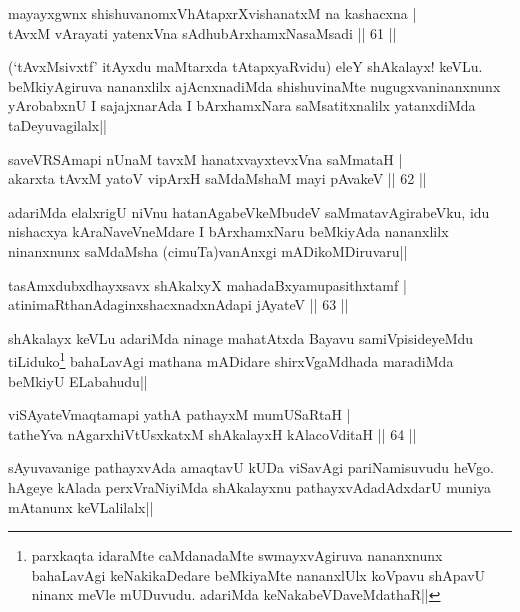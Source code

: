 \begin{shl}
mayayxgwnx shishuvanomxVhAtapxrXvishanatxM na kashacxna |\\
tAvxM vArayati yatenxVna sAdhubArxhamxNasaMsadi \hfill || 61 ||
\end{shl}

\begin{artha}
(`tAvxMsivxtf' itAyxdu maMtarxda tAtapxyaRvidu) eleY shAkalayx! keVLu. beMkiyAgiruva nananxlilx ajAcnxnadiMda shishuvinaMte nugugxvaninanxnunx yArobabxnU I sajajxnarAda I bArxhamxNara saMsatitxnalilx yatanxdiMda taDeyuvagilalx||
\end{artha}

\begin{shl}
saveVRSAmapi nUnaM tavxM hanatxvayxtevxVna saMmataH |\\
akarxta tAvxM yatoV vipArxH saMdaMshaM mayi pAvakeV \hfill || 62 ||
\end{shl}

\begin{artha}
adariMda elalxrigU niVnu hatanAgabeVkeMbudeV saMmatavAgirabeVku, idu nishacxya kAraNaveVneMdare I bArxhamxNaru beMkiyAda nananxlilx ninanxnunx saMdaMsha (cimuTa)vanAnxgi mADikoMDiruvaru||
\end{artha}

\begin{shl}
tasAmxdubxdhayxsavx shAkalxyX mahadaBxyamupasithxtamf |\\
atinimaRthanAdaginxshacxnadxnAdapi jAyateV \hfill || 63 ||
\end{shl}

\begin{artha}
shAkalayx keVLu adariMda ninage mahatAtxda Bayavu samiVpisideyeMdu tiLiduko\footnote[1]{parxkaqta idaraMte caMdanadaMte swmayxvAgiruva nananxnunx bahaLavAgi keNakikaDedare beMkiyaMte nananxlUlx koVpavu shApavU ninanx meVle mUDuvudu. adariMda keNakabeVDaveMdathaR||} bahaLavAgi mathana mADidare shirxVgaMdhada maradiMda beMkiyU ELabahudu||
\end{artha}

\begin{shl}
viSAyateV\s maqtamapi yathA pathayxM mumUSaRtaH |\\
tatheYva nAgarxhiVtUsxkatxM shAkalayxH kAlacoVditaH \hfill || 64 ||
\end{shl}

\begin{artha}%
sAyuvavanige pathayxvAda amaqtavU kUDa viSavAgi pariNamisuvudu heVgo. hAgeye kAlada perxVraNiyiMda shAkalayxnu pathayxvAdadAdxdarU muniya mAtanunx keVLalilalx||
\end{artha}

